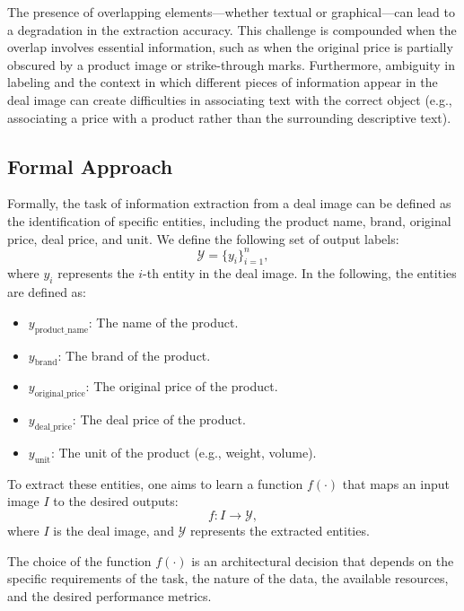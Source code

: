 \documentclass[11pt]{article}
\begin{document}
The presence of overlapping elements—whether textual or graphical—can lead to a degradation in the extraction accuracy. This challenge is compounded when the overlap involves essential information, such as when the original price is partially obscured by a product image or strike-through marks. Furthermore, ambiguity in labeling and the context in which different pieces of information appear in the deal image can create difficulties in associating text with the correct object (e.g., associating a price with a product rather than the surrounding descriptive text).

\subsection{Formal Approach}
Formally, the task of information extraction from a deal image can be defined as the identification of specific entities, including the product name, brand, original price, deal price, and unit. We define the following set of output labels:
\begin{equation}
\mathcal{Y} = \{y_{i}\}_{i=1}^{n},
\end{equation}
where \(y_{i}\) represents the $i$-th entity in the deal image. In the following, the entities are defined as:
\begin{itemize}
    \item \(y_{\text{product\_name}}\): The name of the product.
    \item \(y_{\text{brand}}\): The brand of the product.
    \item \(y_{\text{original\_price}}\): The original price of the product.
    \item \(y_{\text{deal\_price}}\): The deal price of the product.
    \item \(y_{\text{unit}}\): The unit of the product (e.g., weight, volume).
\end{itemize}

To extract these entities, one aims to learn a function \(f(\cdot)\) that maps an input image \(I\) to the desired outputs:
\begin{equation}
    f: I \to \mathcal{Y},
\end{equation}
where \( I \) is the deal image, and \( \mathcal{Y} \) represents the extracted entities.

The choice of the function \( f(\cdot) \) is an architectural decision that depends on the specific requirements of the task, the nature of the data, the available resources, and the desired performance metrics. 
\end{document}
